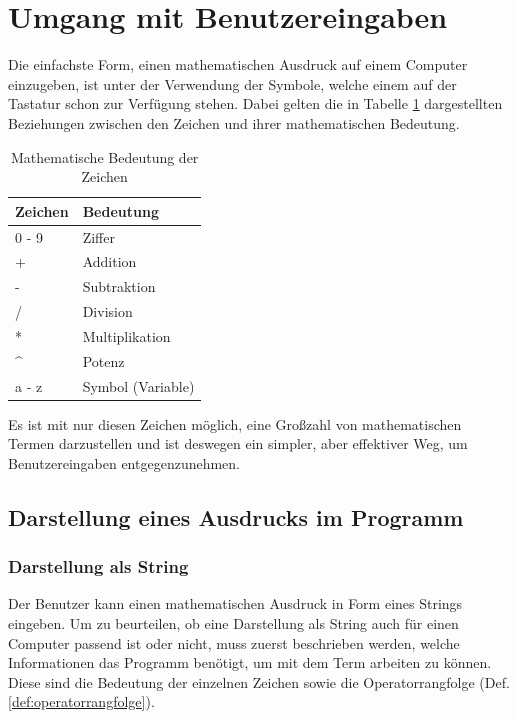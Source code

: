 \documentclass[11pt]{article}
\newcommand{\lab}[1]{(Def. \ref{#1})}
\begin{document}
\section{Umgang mit Benutzereingaben}
Die einfachste Form, einen mathematischen Ausdruck auf einem Computer einzugeben, 
ist unter der Verwendung der Symbole, welche einem auf der Tastatur schon zur Verfügung stehen. 
Dabei gelten die in Tabelle \ref{table:symbols} dargestellten Beziehungen zwischen den Zeichen 
und ihrer mathematischen Bedeutung.
\begin{table}[h]
\centering
\begin{tabular}{|l|l|}
\hline
  Zeichen               & Bedeutung         \\ \hline \hline
  0 - 9                 & Ziffer            \\ \hline
  +                     & Addition          \\ \hline
  -                     & Subtraktion        \\ \hline
  /                     & Division          \\ \hline
  *                     & Multiplikation    \\ \hline
  \textasciicircum      & Potenz            \\ \hline
  a - z                 & Symbol (Variable) \\ \hline
\end{tabular}
\caption{Mathematische Bedeutung der Zeichen}
\label{table:symbols}
\end{table}

Es ist mit nur diesen Zeichen möglich, eine Großzahl von mathematischen Termen darzustellen 
und ist deswegen ein simpler, aber effektiver Weg, um Benutzereingaben entgegenzunehmen.

\subsection{Darstellung eines Ausdrucks im Programm}
\subsubsection{Darstellung als String}

Der Benutzer kann einen mathematischen Ausdruck in Form eines Strings eingeben. 
Um zu beurteilen, ob eine Darstellung als String auch für einen Computer passend ist oder nicht, 
muss zuerst beschrieben werden, welche Informationen das Programm benötigt,
um mit dem Term arbeiten zu können.
Diese sind die Bedeutung
der einzelnen Zeichen sowie die Operatorrangfolge \lab{def:operatorrangfolge}.
\end{document}
